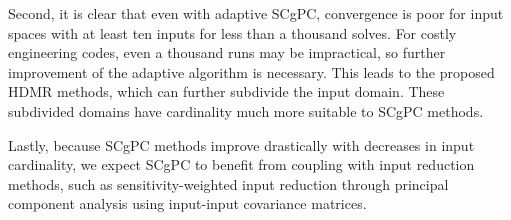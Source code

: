 Second, it is clear that even with adaptive SCgPC, convergence is poor for input spaces with at least ten
inputs for less than a thousand solves.  For costly engineering codes, even a thousand runs may be
impractical, so further improvement of the adaptive algorithm is necessary.  This leads to the
proposed HDMR methods, which can further subdivide the input domain.  These subdivided domains have
cardinality much more suitable to SCgPC methods.

Lastly, because SCgPC methods improve drastically with decreases in input cardinality, we expect SCgPC to
benefit from coupling with input reduction methods, such as sensitivity-weighted input reduction through
principal component analysis using input-input covariance matrices.
